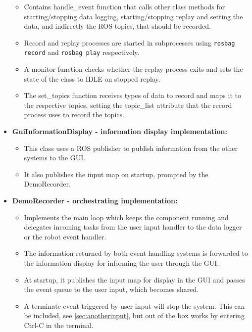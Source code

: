 \documentclass{CSSRforAfrica}
\begin{document}
\begin{itemize}
    \begin{itemize}
        \item Contains handle\_event function that calls other class methods for starting/stopping data logging, starting/stopping replay and setting the data, and indirectly the ROS topics, that should be recorded. 
        \item Record and replay processes are started in subprocesses using \texttt{rosbag record} and \texttt{rosbag play} respectively. 
        \item A monitor function checks whether the replay process exits and sets the state of the class to IDLE on stopped replay.
        \item The set\_topics function receives types of data to record and maps it to the respective topics, setting the topic\_list attribute that the record process uses to record the topics.  
    \end{itemize}
    \newpage
    \item \textbf{GuiInformationDisplay - information display implementation:}
    \begin{itemize}
        \item This class uses a ROS publisher to publish information from the other systems to the GUI. 
        \item It also publishes the input map on startup, prompted by the DemoRecorder. 
    \end{itemize}
    \item \textbf{DemoRecorder - orchestrating implementation:}
    \begin{itemize}
        \item Implements the main loop which keeps the component running and delegates incoming tasks from the user input handler to the data logger or the robot event handler. 
        \item The information returned by both event handling systems is forwarded to the information display for informing the user through the GUI. 
        \item At startup, it publishes the input map for display in the GUI and passes the event queue to the user input, which becomes shared. 
        \item A terminate event triggered by user input will stop the system. This can be included, see \cref{sec:anotherinput}, but out of the box works by entering Ctrl-C in the terminal. 
    \end{itemize}
\end{itemize}
\end{document}
